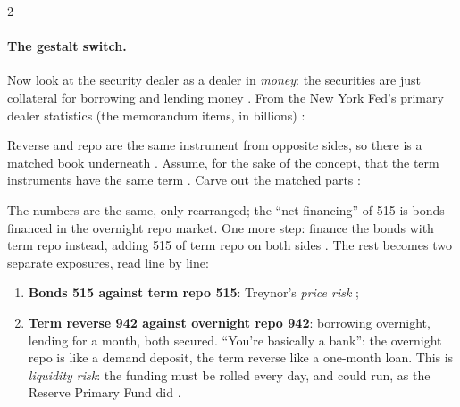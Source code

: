 \begin{paracol}{2}
\paragraph{The gestalt switch.} Now look at the security dealer as a dealer in \emph{money}: the securities are just collateral for borrowing and lending money
. From the New York Fed's primary dealer statistics (the memorandum items, in billions) :
\begin{taccts}
\end{taccts}
Reverse and repo are the same instrument from opposite sides, so there is a matched book underneath . Assume, for the sake of the concept, that the
term instruments have the same term . Carve out the matched parts :
\begin{taccts}
\quad
{}
\end{taccts}
The numbers are the same, only rearranged; the ``net financing'' of 515 is bonds financed in the overnight repo market. One more step: finance the bonds with term repo instead,
adding 515 of term repo on both sides . The rest becomes two separate exposures, read line by line:
\begin{taccts}
\end{taccts}
\begin{enumerate}
  \item \textbf{Bonds 515 against term repo 515}: Treynor's \emph{price risk} ;
  \item \textbf{Term reverse 942 against overnight repo 942}: borrowing overnight, lending for a month, both secured. ``You're basically a bank'': the overnight repo is like a demand
        deposit, the term reverse like a one-month loan. This is \emph{liquidity risk}: the funding must be rolled every day, and could run, as the Reserve Primary Fund did
        .
\end{enumerate}


\end{paracol}
